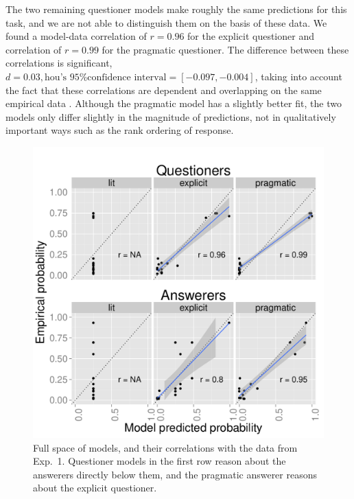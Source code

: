 \documentclass[12pt, floatsintext, man]{apa6}
\begin{document}
The two remaining questioner models make roughly the same predictions for this task, and we are not able to distinguish them on the basis of these data. 
We found a model-data correlation of $r = 0.96$ for the explicit questioner and correlation of $r = 0.99$ for the pragmatic questioner. The difference between these correlations is significant, $d = 0.03, \textrm{hou's 95\% confidence interval} = [-0.097, -0.004]$, taking into account the fact that these correlations are dependent and overlapping on the same empirical data \cite{DiedenhofenMusch14_cocor}. Although the pragmatic model has a slightly better fit, the two models only differ slightly in the magnitude of predictions, not in qualitatively important ways such as the rank ordering of response.
%
\begin{figure}[t!]
\begin{center}
\includegraphics[scale=.75]{Exp1ModelFits.pdf}
\end{center}
\vspace{-.5cm}
\caption{Full space of models, and their correlations with the data from Exp.~1. Questioner models in the first row reason about the answerers directly below them, and the pragmatic answerer reasons about the explicit questioner.}
\label{fig:Exp1ModelSpace}
\vspace{-.15cm}
\end{figure}
\end{document}
